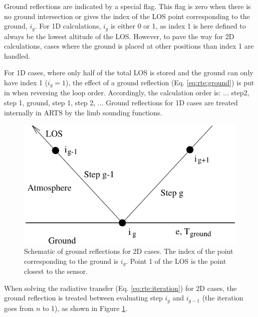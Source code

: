   
  
  \label{sec:los:ground}
  
  Ground reflections are indicated by a special flag. This flag is
  zero when there is no ground intersection or gives the index of the
  LOS point corresponding to the ground, $i_g$. For 1D calculations,
  $i_g$ is either 0 or 1, as index 1 is here defined to always be the
  lowest altitude of the LOS. However, to pave the way for 2D
  calculations, cases where the ground is placed at other positions
  than index 1 are handled.
  
  For 1D cases, where only half of the total LOS is stored and the
  ground can only have index 1 ($i_g=1$), the effect of a ground
  reflection (Eq. \ref{eq:rte:ground}) is put in when reversing the
  loop order.  Accordingly, the calculation order is: ... step2, step
  1, ground, step 1, step 2, ... Ground reflections for 1D cases are
  treated internally in ARTS by the limb sounding functions.
  
  \begin{figure}[b]
   \begin{center}
     \includegraphics*[width=0.75\hsize]{Figs/ground}
    \caption{Schematic of ground reflections for 2D cases. The index 
             of the point corresponding to the ground is $i_g$. Point 1
             of the LOS is the point closest to the sensor. }  
    \label{fig:los1d:ground}  
   \end{center}
  \end{figure}
 
  When solving the radiative transfer (Eq. \ref{eq:rte:iteration}) for
  2D cases, the ground reflection is treated between evaluating step
  $i_g$ and $i_{g-1}$ (the iteration goes from $n$ to 1), as shown in
  Figure \ref{fig:los1d:ground}.




